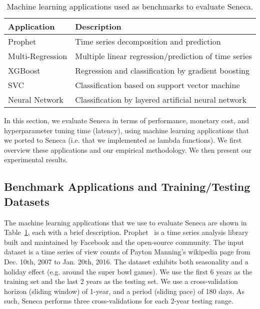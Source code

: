 \begin{table}[t]
\centering
\begin{tabular}{|l|l|} \hline
\textbf{Application}& \textbf{Description}\\
\hline
Prophet& Time series decomposition and prediction\\ 
\hline
Multi-Regression& Multiple linear regression/prediction of time series\\
\hline
XGBoost& Regression and classification by gradient boosting\\
\hline
SVC & Classification based on support vector machine\\
\hline
Neural Network& Classification by layered artificial neural network\\
\hline
\end{tabular}
\caption{Machine learning applications used as benchmarks
to evaluate Seneca. 
\label{tab:bmarks}}
\end{table}

In this section,
we evaluate Seneca in terms of performance, monetary cost, and hyperparameter tuning time (latency), 
using machine learning applications that we ported to Seneca (i.e. that we implemented
as lambda functions). 
We first overview these applications and our empirical methodology. 
We then present our experimental results. 

\subsection{Benchmark Applications and Training/Testing  Datasets}
The machine learning applications that we use to evaluate Seneca 
are shown in Table~\ref{tab:bmarks}, each with 
a brief description.
Prophet~\cite{ref:prophet} is a time series analysis library built and maintained by Facebook and the open-source community. The input dataset is a time series of view counts
of Payton Manning's wikipedia page from Dec. 10th, 2007 to Jan. 20th, 2016. 
The dataset exhibits both seasonality and a holiday effect (e.g. around the super bowl games). 
We use the first 6 years as the training set and the last 2 years as the testing set.
We use a cross-validation horizon (sliding window) of 1-year, 
and a period (sliding pace) 
of 180 days.  As such, Seneca performs three cross-validations for each 2-year testing range.

